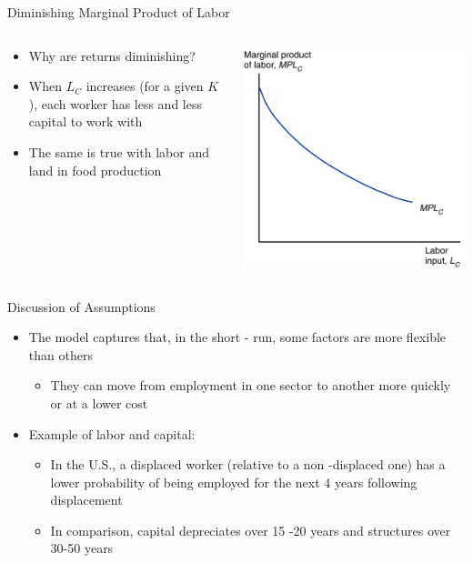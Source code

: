\documentclass[10pt,hyperref={CJKbookmarks=true},xcolor=dvipsnames,aspectratio=169]{beamer}
\begin{document}
\begin{frame}{Diminishing Marginal Product of Labor}


\begin{columns}[onlytextwidth]
\begin{column}{0.4\textwidth}
\begin{itemize}
\item Why are returns diminishing? 
\item When $L_{C}$ increases (for a given $K$), each worker has less and
less capital to work with 
\item The same is true with labor and land in food production
\end{itemize}

\end{column}
\begin{column}{0.6\textwidth}
\centering \includegraphics[width=0.7\columnwidth]{fig/sfm/lec4-6}
\end{column}
\end{columns}


\end{frame}

\begin{frame}{Discussion of Assumptions}

\begin{itemize}
\item The model captures that, in the short - run, some factors are more
flexible than others 

\begin{itemize}
\item They can move from employment in one sector to another more quickly
or at a lower cost 
\end{itemize}
\item Example of labor and capital: 

\begin{itemize}
\item In the U.S., a displaced worker (relative to a non -displaced one)
has a lower probability of being employed for the next 4 years following
displacement 
\item In comparison, capital depreciates over 15 -20 years and structures
over 30-50 years 
\end{itemize}
\end{itemize}
\end{frame}
\end{document}
